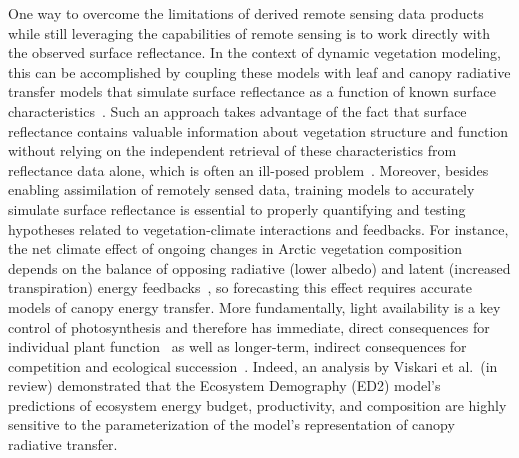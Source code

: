 One way to overcome the limitations of derived remote sensing data products while still leveraging the capabilities of remote sensing is to work directly with the observed surface reflectance.
In the context of dynamic vegetation modeling, this can be accomplished by coupling these models with leaf and canopy radiative transfer models that simulate surface reflectance as a function of known surface characteristics~\cite{quaife_2008_assimilating}.
% 
% 
Such an approach takes advantage of the fact that surface reflectance contains valuable information about vegetation structure and function without relying on the independent retrieval of these characteristics from reflectance data alone, which is often an ill-posed problem~\cite{combal_2003_retrieval,lewis_2007_spectral}.
Moreover, besides enabling assimilation of remotely sensed data, training models to accurately simulate surface reflectance is essential to properly quantifying and testing hypotheses related to vegetation-climate interactions and feedbacks.
For instance, the net climate effect of ongoing changes in Arctic vegetation composition depends on the balance of opposing radiative (lower albedo) and latent (increased transpiration) energy feedbacks~\cite{Swann_2010_changes}, so forecasting this effect requires accurate models of canopy energy transfer.
More fundamentally, light availability is a key control of photosynthesis and therefore has
immediate, direct consequences for individual plant function~\cite{hikosaka_1995_model,robakowski_2004_needle,Niinemets_2016_within,Keenan_2016_global}
as well as longer-term, indirect consequences for competition and ecological succession~\cite{Niinemets_2006_tolerance,Kitajima_2013_leaf,Falster_2017_multitrait}.
Indeed, an analysis by Viskari et al.\ (in review) \nocite{Viskari_inreview_ED} demonstrated that the Ecosystem Demography (ED2) model's predictions of ecosystem energy budget, productivity, and composition are highly sensitive to the parameterization of the model's representation of canopy radiative transfer.
% 
% 
% 


